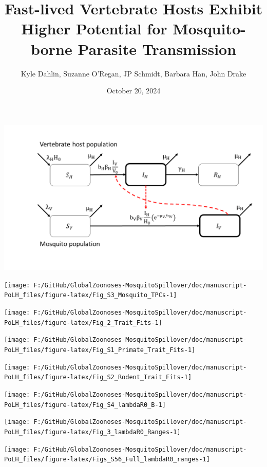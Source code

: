 \documentclass[
]{article}
\title{Fast-lived Vertebrate Hosts Exhibit Higher Potential for
Mosquito-borne Parasite Transmission}
\author{Kyle Dahlin, Suzanne O'Regan, JP Schmidt, Barbara Han, John
Drake}
\date{October 20, 2024}
\begin{document}
\maketitle

\begin{center}\includegraphics[width=1\linewidth,]{results/flow_diagram} \end{center}

\begin{center}\texttt{[image: F:/GitHub/GlobalZoonoses-MosquitoSpillover/doc/manuscript-PoLH\_files/figure-latex/Fig\_S3\_Mosquito\_TPCs-1]} \end{center}

\begin{center}\texttt{[image: F:/GitHub/GlobalZoonoses-MosquitoSpillover/doc/manuscript-PoLH\_files/figure-latex/Fig\_2\_Trait\_Fits-1]} \end{center}

\begin{center}\texttt{[image: F:/GitHub/GlobalZoonoses-MosquitoSpillover/doc/manuscript-PoLH\_files/figure-latex/Fig\_S1\_Primate\_Trait\_Fits-1]} \end{center}

\begin{center}\texttt{[image: F:/GitHub/GlobalZoonoses-MosquitoSpillover/doc/manuscript-PoLH\_files/figure-latex/Fig\_S2\_Rodent\_Trait\_Fits-1]} \end{center}

\texttt{[image: F:/GitHub/GlobalZoonoses-MosquitoSpillover/doc/manuscript-PoLH\_files/figure-latex/Fig\_S4\_lambdaR0\_B-1]}

\begin{center}\texttt{[image: F:/GitHub/GlobalZoonoses-MosquitoSpillover/doc/manuscript-PoLH\_files/figure-latex/Fig\_3\_lambdaR0\_Ranges-1]} \end{center}

\begin{center}\texttt{[image: F:/GitHub/GlobalZoonoses-MosquitoSpillover/doc/manuscript-PoLH\_files/figure-latex/Figs\_S56\_Full\_lambdaR0\_ranges-1]} \end{center}
\end{document}
